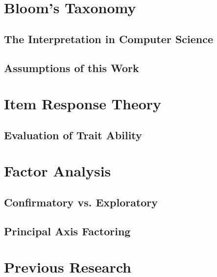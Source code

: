 
\section{Bloom's Taxonomy}

\subsection{The Interpretation in Computer Science}
\subsection{Assumptions of this Work}

\section{Item Response Theory}

\subsection{Evaluation of Trait Ability}

\section{Factor Analysis}

\subsection{Confirmatory vs. Exploratory}
\subsection{Principal Axis Factoring}

\section{Previous Research}

